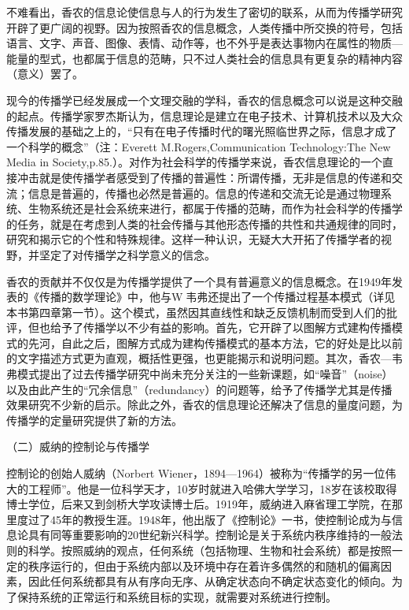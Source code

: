 \documentclass[UTF8,12pt]{ctexart}
\numberwithin{equation}{section} %
\numberwithin{figure}{section}
\numberwithin{table}{section}
\begin{document}
	不难看出，香农的信息论使信息与人的行为发生了密切的联系，从而为传播学研究开辟了更广阔的视野。因为按照香农的信息概念，人类传播中所交换的符号，包括语言、文字、声音、图像、表情、动作等，也不外乎是表达事物内在属性的物质—能量的型式，也都属于信息的范畴，只不过人类社会的信息具有更复杂的精神内容（意义）罢了。
	
	现今的传播学已经发展成一个文理交融的学科，香农的信息概念可以说是这种交融的起点。传播学家罗杰斯认为，信息理论是建立在电子技术、计算机技术以及大众传播发展的基础之上的，“只有在电子传播时代的曙光照临世界之际，信息才成了一个科学的概念”（注：Everett M.Rogers,Communication Technology:The New Media in Society,p.85.）。对作为社会科学的传播学来说，香农信息理论的一个直接冲击就是使传播学者感受到了传播的普遍性：所谓传播，无非是信息的传递和交流；信息是普遍的，传播也必然是普遍的。信息的传递和交流无论是通过物理系统、生物系统还是社会系统来进行，都属于传播的范畴，而作为社会科学的传播学的任务，就是在考虑到人类的社会传播与其他形态传播的共性和共通规律的同时，研究和揭示它的个性和特殊规律。这样一种认识，无疑大大开拓了传播学者的视野，并坚定了对传播学之科学意义的信念。
	
	香农的贡献并不仅仅是为传播学提供了一个具有普遍意义的信息概念。在1949年发表的《传播的数学理论》中，他与W韦弗还提出了一个传播过程基本模式（详见本书第四章第一节）。这个模式，虽然因其直线性和缺乏反馈机制而受到人们的批评，但也给予了传播学以不少有益的影响。首先，它开辟了以图解方式建构传播模式的先河，自此之后，图解方式成为建构传播模式的基本方法，它的好处是比以前的文字描述方式更为直观，概括性更强，也更能揭示和说明问题。其次，香农—韦弗模式提出了过去传播学研究中尚未充分关注的一些新课题，如“噪音”（noise）以及由此产生的“冗余信息”（redundancy）的问题等，给予了传播学尤其是传播效果研究不少新的启示。除此之外，香农的信息理论还解决了信息的量度问题，为传播学的定量研究提供了新的方法。
	
	（二）威纳的控制论与传播学
	
	控制论的创始人威纳（Norbert Wiener，1894—1964）被称为“传播学的另一位伟大的工程师”。他是一位科学天才，10岁时就进入哈佛大学学习，18岁在该校取得博士学位，后来又到剑桥大学攻读博士后。1919年，威纳进入麻省理工学院，在那里度过了45年的教授生涯。1948年，他出版了《控制论》一书，使控制论成为与信息论具有同等重要影响的20世纪新兴科学。控制论是关于系统内秩序维持的一般法则的科学。按照威纳的观点，任何系统（包括物理、生物和社会系统）都是按照一定的秩序运行的，但由于系统内部以及环境中存在着许多偶然的和随机的偏离因素，因此任何系统都具有从有序向无序、从确定状态向不确定状态变化的倾向。为了保持系统的正常运行和系统目标的实现，就需要对系统进行控制。
	
\end{document}

